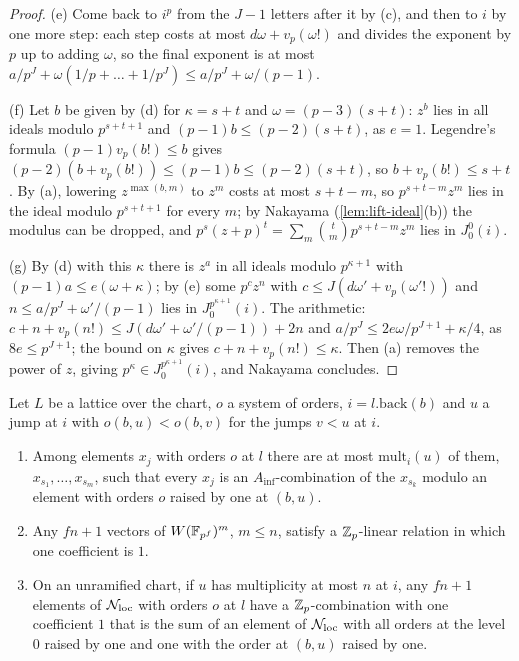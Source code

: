 \begin{proof}
(e) Come back to $i^p$ from the $J-1$ letters after it by (c), and then to $i$ by one more step: each step costs at most $d\omega+v_p(\omega!)$ and divides the exponent by $p$ up to adding $\omega$, so the final exponent is at most $a/p^J+\omega(1/p+\dots+1/p^J)\le a/p^J+\omega/(p-1)$.

(f) Let $b$ be given by (d) for $\kappa=s+t$ and $\omega=(p-3)(s+t)$: $z^b$ lies in all ideals modulo $p^{s+t+1}$ and $(p-1)b\le(p-2)(s+t)$, as $e=1$. Legendre's formula $(p-1)v_p(b!)\le b$ gives $(p-2)(b+v_p(b!))\le(p-1)b\le(p-2)(s+t)$, so $b+v_p(b!)\le s+t$. By (a), lowering $z^{\max(b,m)}$ to $z^m$ costs at most $s+t-m$,
so $p^{s+t-m}z^m$ lies in the ideal modulo $p^{s+t+1}$ for every $m$; by Nakayama (\cref{lem:lift-ideal}(b)) the modulus can be dropped, and $p^s(z+p)^t=\sum_m\binom tmp^{s+t-m}z^m$ lies in $J^0_0(i)$.

(g) By (d) with this $\kappa$ there is $z^a$ in all ideals modulo $p^{\kappa+1}$ with $(p-1)a\le e(\omega+\kappa)$; by (e) some $p^cz^n$ with $c\le J(d\omega'+v_p(\omega'!))$ and $n\le a/p^J+\omega'/(p-1)$ lies in $J^{p^{\kappa+1}}_0(i)$. The arithmetic: $c+n+v_p(n!)\le J(d\omega'+\omega'/(p-1))+2n$ and
$a/p^J\le2e\omega/p^{J+1}+\kappa/4$, as $8e\le p^{J+1}$; the bound on $\kappa$ gives $c+n+v_p(n!)\le\kappa$. Then (a) removes the power of $z$, giving $p^\kappa\in J^{p^{\kappa+1}}_0(i)$, and Nakayama concludes.
\end{proof}

\begin{lemma}\label{lem:one-step}
Let $L$ be a lattice over the chart, $o$ a system of orders, $i=l.\mathrm{back}(b)$ and $u$ a jump at $i$ with $o(b,u)<o(b,v)$ for the jumps $v<u$ at $i$.
\begin{enumerate}[label=\textup{(\alph*)}]
\item Among elements $x_j$ with orders $o$ at $l$ there are at most $\mathrm{mult}_i(u)$ of them, $x_{s_1},\dots,x_{s_m}$, such that every $x_j$ is an $A_{\inf}$-combination of the $x_{s_k}$ modulo an element with orders $o$ raised by one at $(b,u)$.
\item Any $fn+1$ vectors of $W(\mathbb{F}_{p^f})^m$, $m\le n$, satisfy a $\mathbb{Z}_p$-linear relation in which one coefficient is $1$.
\item On an unramified chart, if $u$ has multiplicity at most $n$ at $i$, any $fn+1$ elements of $\mathcal N_{\rm loc}$ with orders $o$ at $l$ have a $\mathbb{Z}_p$-combination with one coefficient $1$ that is the sum of an element of $\mathcal N_{\rm loc}$ with all orders at the level $0$ raised by one and one
with the order at $(b,u)$ raised by one.
\end{enumerate}
\end{lemma}

